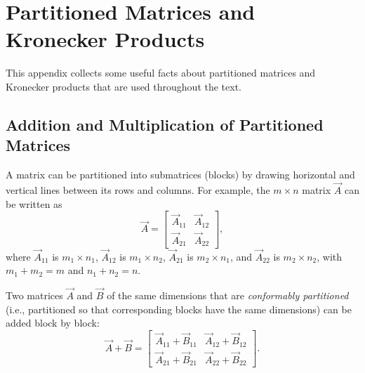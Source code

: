 
\chapter{Partitioned Matrices and Kronecker Products}
\label{app:matrices}

This appendix collects some useful facts about partitioned matrices and
Kronecker products that are used throughout the text.

\section{Addition and Multiplication of Partitioned Matrices}
\label{sec:A.1}

A matrix can be partitioned into submatrices (blocks) by drawing horizontal
and vertical lines between its rows and columns.  For example, the
$m \times n$ matrix $\vec{A}$ can be written as
\begin{equation}
  \vec{A} =
  \begin{bmatrix}
    \vec{A}_{11} & \vec{A}_{12} \\
    \vec{A}_{21} & \vec{A}_{22}
  \end{bmatrix},
  \label{eq:A.1}
\end{equation}
where $\vec{A}_{11}$ is $m_1 \times n_1$, $\vec{A}_{12}$ is
$m_1 \times n_2$, $\vec{A}_{21}$ is $m_2 \times n_1$, and
$\vec{A}_{22}$ is $m_2 \times n_2$, with $m_1 + m_2 = m$ and
$n_1 + n_2 = n$.

Two matrices $\vec{A}$ and $\vec{B}$ of the same dimensions that are
\emph{conformably partitioned} (i.e., partitioned so that corresponding
blocks have the same dimensions) can be added block by block:
\begin{equation}
  \vec{A} + \vec{B} =
  \begin{bmatrix}
    \vec{A}_{11} + \vec{B}_{11} & \vec{A}_{12} + \vec{B}_{12} \\
    \vec{A}_{21} + \vec{B}_{21} & \vec{A}_{22} + \vec{B}_{22}
  \end{bmatrix}.
  \label{eq:A.2}
\end{equation}

